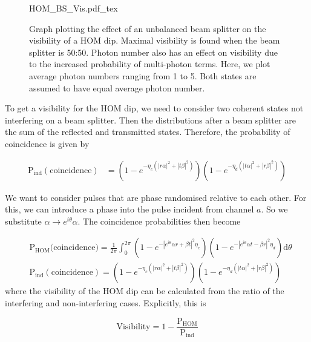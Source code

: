 
\begin{figure}[t]
	\centering
	\small
	\def\svgwidth{0.8\textwidth} 
	{HOM_BS_Vis.pdf_tex}
	\caption[Coherent state photon number visibility]{Graph plotting the effect of an unbalanced beam splitter on the visibility of a HOM dip. Maximal visibility is found when the beam splitter is 50:50. Photon number also has an effect on visibility due to the increased probability of multi-photon terms. Here, we plot average photon numbers ranging from 1 to 5. Both states are assumed to have equal average photon number.}
	\label{fig:HOM_BS_Vis}
\end{figure}

To get a visibility for the HOM dip, we need to consider two coherent states not interfering on a beam splitter. Then the distributions after a beam splitter are the sum of the reflected and transmitted states. Therefore, the probability of coincidence is given by


\begin{align}
	\text{P}_\text{ind}(\text{coincidence}) &= \left(1 - e^{-\eta_c(|r\alpha|^2 + |t\beta|^2)}\right)\left(1 - e^{-\eta_d(|t\alpha|^2 + |r\beta|^2)}\right)
\end{align}

We want to consider pulses that are phase randomised relative to each other. For this, we can introduce a phase into the pulse incident from channel $a$. So we substitute $\alpha \rightarrow  e^{i\theta} \alpha$. The coincidence probabilities then become

\begin{align}
	&\text{P}_\text{HOM}\text{(coincidence)} = \frac{1}{2\pi}\int_0^{2\pi}\left(1 - e^{-|e^{i\theta}\alpha r + \beta t|^2 \eta_c}\right)\left(1 - e^{-|e^{i\theta}\alpha t - \beta r|^2 \eta_d}\right)\text{d}\theta\\
	&\text{P}_\text{ind}(\text{coincidence}) = \left(1 - e^{-\eta_c(|r\alpha|^2 + |t\beta|^2)}\right)\left(1 - e^{-\eta_d(|t\alpha|^2 + |r\beta|^2)}\right)
\end{align}
where the visibility of the HOM dip can be calculated from the ratio of the interfering and non-interfering cases. Explicitly, this is

\begin{equation}
	\text{Visibility} = 1 - \frac{\text{P}_\text{HOM}}{\text{P}_\text{ind}}
\end{equation}

